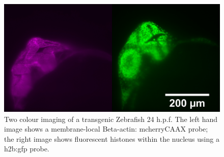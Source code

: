 

\begin{figure}
    \centering
    \includegraphics[width=0.8\linewidth]{./fish_image}
    \caption{Two colour imaging of a transgenic Zebrafish 24 h.p.f.
    The left hand image shows a membrane-local Beta-actin: mcherryCAAX probe;
    the right image shows fluorescent histones within the nucleus using a h2b:gfp probe.}
    \label{fig:fish_image}
\end{figure}

